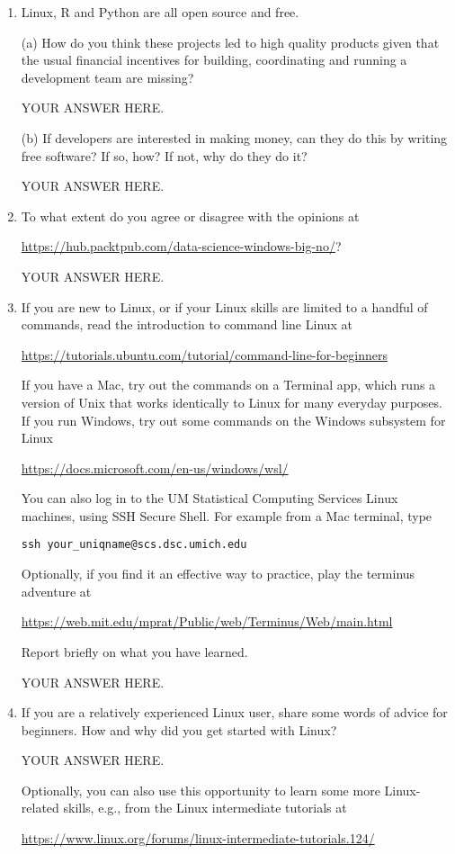 \documentclass[12pt]{article}
\begin{document}
\begin{enumerate}

\item Linux, R and Python are all open source and free. 

(a) How do you think these projects led to high quality products given that the  usual financial incentives for building, coordinating and running a development team are missing?

YOUR ANSWER HERE.

(b) If developers are interested in making money, can they do this by writing free software? If so, how? If not, why do they do it?

YOUR ANSWER HERE.
  
\item To what extent do you agree or disagree with the opinions at

\url{https://hub.packtpub.com/data-science-windows-big-no/}? 

YOUR ANSWER HERE.

\item If you are new to Linux, or if your Linux skills are limited to a handful of commands, read the introduction to command line Linux at
  
\url{https://tutorials.ubuntu.com/tutorial/command-line-for-beginners}

If you have a Mac, try out the commands on a Terminal app, which runs a version of Unix that works identically to Linux for many everyday purposes. If you run Windows, try out some commands on the Windows subsystem for Linux

\url{https://docs.microsoft.com/en-us/windows/wsl/}

You can also log in to the UM Statistical Computing Services Linux machines, using SSH Secure Shell. For example from a Mac terminal, type

\texttt{ssh your\_uniqname@scs.dsc.umich.edu}

Optionally, if you find it an effective way to practice, play the terminus adventure at

\url{https://web.mit.edu/mprat/Public/web/Terminus/Web/main.html}

Report briefly on what you have learned.

YOUR ANSWER HERE.

\item If you are a relatively experienced Linux user, share some words of advice for beginners. How and why did you get started with Linux?  

YOUR ANSWER HERE.

Optionally, you can also use this opportunity to learn some more Linux-related skills, e.g., from the Linux intermediate tutorials at

\url{https://www.linux.org/forums/linux-intermediate-tutorials.124/}


\end{enumerate}
\end{document}
